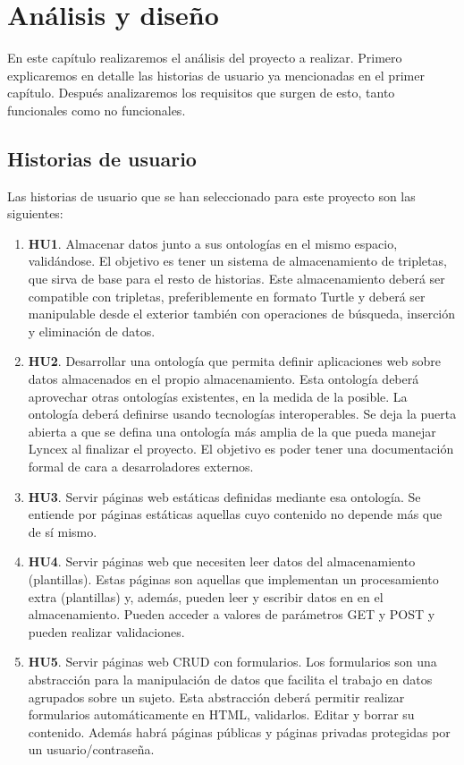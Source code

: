 \documentclass[openright,twoside,12pt]{book}
\begin{document}
\chapter{Análisis y diseño}

En este capítulo realizaremos el análisis del proyecto a realizar. Primero explicaremos en detalle las historias de usuario ya mencionadas en el primer capítulo. Después analizaremos los requisitos que surgen de esto, tanto funcionales como no funcionales.

\section{Historias de usuario}

Las historias de usuario que se han seleccionado para este proyecto son las siguientes:

\begin{enumerate}
    \item\textbf{HU1}. Almacenar datos junto a sus ontologías en el mismo espacio, validándose. El objetivo es tener un sistema de almacenamiento de tripletas, que sirva de base para el resto de historias. Este almacenamiento deberá ser compatible con tripletas, preferiblemente en formato Turtle y deberá ser manipulable desde el exterior también con operaciones de búsqueda, inserción y eliminación de datos.
    \item\textbf{HU2}. Desarrollar una ontología que permita definir aplicaciones web sobre datos almacenados en el propio almacenamiento. Esta ontología deberá aprovechar otras ontologías existentes, en la medida de la posible. La ontología deberá definirse usando tecnologías interoperables. Se deja la puerta abierta a que se defina una ontología más amplia de la que pueda manejar Lyncex al finalizar el proyecto. El objetivo es poder tener una documentación formal de cara a desarroladores externos.
    \item\textbf{HU3}. Servir páginas web estáticas definidas mediante esa ontología. Se entiende por páginas estáticas aquellas cuyo contenido no depende más que de sí mismo.
    \item\textbf{HU4}. Servir páginas web que necesiten leer datos del almacenamiento (plantillas). Estas páginas son aquellas que implementan un procesamiento extra (plantillas) y, además, pueden leer y escribir datos en en el almacenamiento. Pueden acceder a valores de parámetros GET y POST y pueden realizar validaciones.
    \item\textbf{HU5}. Servir páginas web CRUD con formularios. Los formularios son una abstracción para la manipulación de datos que facilita el trabajo en datos agrupados sobre un sujeto. Esta abstracción deberá permitir realizar formularios automáticamente en HTML, validarlos. Editar y borrar su contenido. Además habrá páginas públicas y páginas privadas protegidas por un usuario/contraseña.
\end{enumerate}
\end{document}
